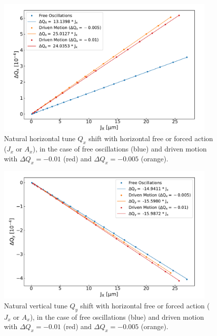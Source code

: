 \begin{figure}[!htb]
    \centering
    \includegraphics*[width=0.96\textwidth]{Figures/Other_Studies/direct_detuning_driven_vs_free.pdf}
    \caption{Natural horizontal tune \(Q_x\) shift with horizontal free or forced action (\(J_x\) or \(A_x\)), in the case of free oscillations (\textcolor{mplblue}{blue}) and driven motion with \(\Delta Q_x = -0.01\) (\textcolor{mplred}{red}) and \(\Delta Q_x = -0.005\) (\textcolor{mplorange}{orange}).}
    \label{figure:horizontal_detuning_comparison}
\end{figure}

\begin{figure}[!htb]
    \centering
    \includegraphics*[width=0.96\textwidth]{Figures/Other_Studies/cross_detuning_driven_vs_free.pdf}
    \caption{Natural vertical tune \(Q_y\) shift with horizontal free or forced action (\(J_x\) or \(A_x\)), in the case of free oscillations (\textcolor{mplblue}{blue}) and driven motion with \(\Delta Q_x = -0.01\) (\textcolor{mplred}{red}) and \(\Delta Q_x = -0.005\) (\textcolor{mplorange}{orange}).}
    \label{figure:vertical_detuning_comparison}
\end{figure}

